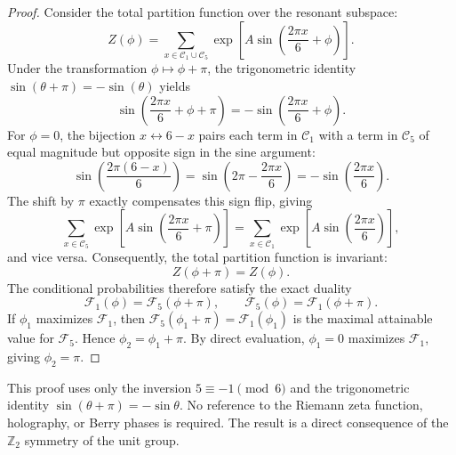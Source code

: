 \documentclass[12pt,a4paper]{article}
\theoremstyle{plain}
\theoremstyle{definition}
\theoremstyle{remark}
\begin{document}
\begin{proof}
Consider the total partition function over the resonant subspace:
\begin{equation}
Z(\phi) = \sum_{x \in \mathcal{C}_1 \cup \mathcal{C}_5} \exp\left[A \sin\left(\frac{2\pi x}{6} + \phi\right)\right].
\label{eq:Z}
\end{equation}
Under the transformation \(\phi \mapsto \phi + \pi\), the trigonometric identity \(\sin(\theta + \pi) = -\sin(\theta)\) yields
\begin{equation}
\sin\left(\frac{2\pi x}{6} + \phi + \pi\right) = -\sin\left(\frac{2\pi x}{6} + \phi\right).
\label{eq:sin_shift}
\end{equation}
For \(\phi = 0\), the bijection \(x \leftrightarrow 6-x\) pairs each term in \(\mathcal{C}_1\) with a term in \(\mathcal{C}_5\) of equal magnitude but opposite sign in the sine argument:
\[
\sin\left(\frac{2\pi(6-x)}{6}\right) = \sin\left(2\pi - \frac{2\pi x}{6}\right) = -\sin\left(\frac{2\pi x}{6}\right).
\]
The shift by \(\pi\) exactly compensates this sign flip, giving
\begin{equation}
\sum_{x \in \mathcal{C}_5} \exp\left[A \sin\left(\frac{2\pi x}{6} + \pi\right)\right] = \sum_{x \in \mathcal{C}_1} \exp\left[A \sin\left(\frac{2\pi x}{6}\right)\right],
\label{eq:pairing}
\end{equation}
and vice versa. Consequently, the total partition function is invariant:
\begin{equation}
Z(\phi + \pi) = Z(\phi).
\label{eq:Zperiod}
\end{equation}
The conditional probabilities therefore satisfy the exact duality
\begin{equation}
\mathcal{F}_1(\phi) = \mathcal{F}_5(\phi + \pi), \qquad \mathcal{F}_5(\phi) = \mathcal{F}_1(\phi + \pi).
\label{eq:duality}
\end{equation}
If \(\phi_1\) maximizes \(\mathcal{F}_1\), then \(\mathcal{F}_5(\phi_1 + \pi) = \mathcal{F}_1(\phi_1)\) is the maximal attainable value for \(\mathcal{F}_5\). Hence \(\phi_2 = \phi_1 + \pi\). By direct evaluation, \(\phi_1 = 0\) maximizes \(\mathcal{F}_1\), giving \(\phi_2 = \pi\).
\end{proof}

This proof uses only the inversion \(5 \equiv -1 \pmod{6}\) and the trigonometric identity \(\sin(\theta + \pi) = -\sin\theta\). No reference to the Riemann zeta function, holography, or Berry phases is required. The result is a direct consequence of the \(\mathbb{Z}_2\) symmetry of the unit group.
\end{document}
